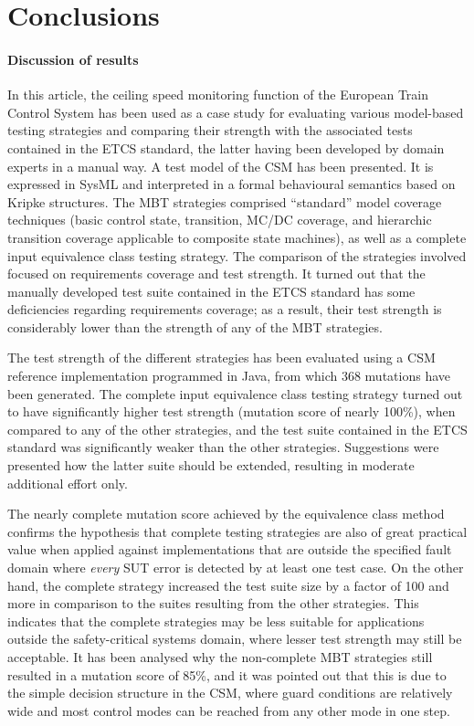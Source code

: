 \section{Conclusions}
\label{sec:conc}



\paragraph{Discussion of results}
In this article, the ceiling speed monitoring function of the European Train
Control System has been used as a case study for evaluating various
model-based testing strategies and comparing their  strength with 
the associated tests contained in the ETCS standard, the latter having
been developed by
domain experts in a manual way. 
A test model of the CSM has been presented. It is expressed in SysML and interpreted
in a formal behavioural semantics based on Kripke structures.
The MBT strategies comprised ``standard'' 
model coverage techniques
(basic control state, transition, MC/DC coverage, and hierarchic
transition coverage applicable to composite state machines), as well as a complete
input equivalence class testing strategy. The comparison of the strategies involved focused on requirements coverage and test strength. 
It turned out that the manually 
developed test suite contained in the ETCS standard has some deficiencies regarding requirements coverage; as a result, their test strength is considerably lower than 
the strength of any of the MBT strategies. 

The test strength of the different strategies has been evaluated using a CSM reference
implementation programmed in Java, from which 368 mutations have been generated.
The complete input equivalence class testing strategy 
turned out to have significantly higher test strength 
(mutation score of nearly 100\%), when compared to any of the 
other strategies, and the test suite contained in the ETCS standard was significantly
weaker than the other strategies. Suggestions were presented how the latter suite 
should be extended, resulting in moderate additional effort only. 

The nearly complete mutation score achieved by the equivalence class method
confirms the hypothesis that complete testing strategies are also of great
practical value when applied against implementations that are outside the 
specified fault domain where {\it every} SUT error is detected by at least one test case. On the other hand, the complete strategy increased the test suite size
by a factor of 100 and more in comparison to the suites resulting from the other
strategies. This indicates that the complete strategies may be less suitable for
applications outside the safety-critical systems domain, where lesser test strength
may still be acceptable. It has been analysed why the non-complete MBT strategies 
still resulted in a mutation score of 85\%, and it was pointed out that this
is due to the simple decision structure in the CSM, where guard conditions are
relatively wide and most control modes can be
reached from any other mode in one step. 



